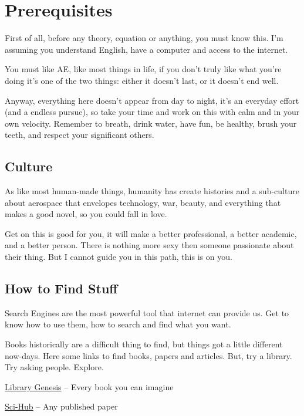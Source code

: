 
\chapter{Prerequisites}
First of all, before any theory, equation or anything,
you must know this.
I'm assuming you understand English, have a computer and access to the
internet.

You must like AE, like most things in life, if you
don't truly like what you're doing it's one of the two things: either it doesn't last, or it doesn't end well.

Anyway, everything here doesn't appear from day to night,
it's an everyday
effort (and a endless pursue), so take your time and work on this
with calm and in your own velocity. Remember to breath, drink water,
have fun, be healthy, brush your teeth, and respect your
significant others.

\section{Culture}

As like most human-made things, humanity
has create histories and a sub-culture about aerospace that envelopes
technology, war, beauty, and everything that makes a good novel,
so you could fall in love.

Get on this is good for you, it will make a better professional,
a better academic, and a better person. There is nothing
more sexy then someone passionate about their thing.
But I cannot guide you in this path, this is on you.

\section{How to Find Stuff}

Search Engines are the most powerful tool that
internet can provide us. Get to know how to use them, how to search
and find what you want.

Books historically are a difficult thing to find,
but things got a little different now-days. Here some links
to find books, papers and articles.
But, try a library. Try asking people. Explore.

\begin{description}
    \item{\href{https://gen.lib.rus.ce/}{Library Genesis} -- Every book you can imagine}
    \item{\href{https://sci-hub.tw/}{Sci-Hub} -- Any published paper}
\end{description}{}


